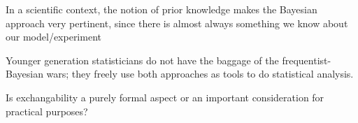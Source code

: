   \I 
In a scientific context, the notion of prior knowledge makes the Bayesian approach very pertinent, since there is almost always something we know about our model/experiment

  \I Younger generation statisticians do not have the baggage of the frequentist-Bayesian wars;
    they freely use both approaches as tools to do statistical analysis. 

  \I Is exchangability a purely formal aspect or an important consideration for practical
    purposes? 
\ei


